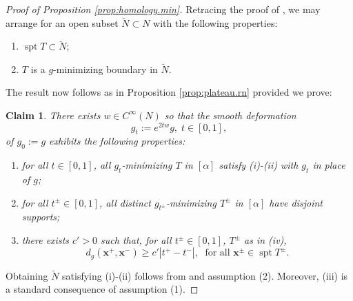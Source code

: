 \documentclass[11pt, letterpaper, reqno]{amsart}
\numberwithin{equation}{section}
\newtheorem{Cla}[Def]{Claim}
\theoremstyle{remark}
\newcommand{\mbfx}{\mathbf{x}}
\newcommand{\spt}{\operatorname{spt}}
\begin{document}
\begin{proof}[Proof of Proposition \ref{prop:homology.min}]
	Retracing the proof of \cite[Lemma 5.7]{CMS:generic.9.10}, we may arrange for an open subset $\breve N \subset N$ with the following properties:
	\begin{enumerate}
		\item[(i)] $\spt T \subset \breve N$;
		\item[(ii)] $T$ is a $g$-minimizing boundary in $\breve N$.
	\end{enumerate}
	The result now follows as in Proposition \ref{prop:plateau.rn} provided we prove:
	\begin{Cla} \label{clai:homology.min}
		There exists $w \in C^\infty(N)$ so that the smooth deformation
		\[ g_t := e^{2tw} g, \; t \in [0,1], \]
		of $g_0 := g$ exhibits the following properties:
		\begin{enumerate}
			\item[(iii)] for all $t \in [0,1]$, all $g_t$-minimizing $T$ in $[\alpha]$ satisfy (i)-(ii) with $g_t$ in place of $g$;
			\item[(iv)] for all $t^\pm \in [0,1]$, all distinct $g_{t^\pm}$-minimizing $T^\pm$ in $[\alpha]$ have disjoint supports;
			\item[(v)] there exists $c' > 0$ such that, for all $t^\pm \in [0,1]$, $T^\pm$ as in (iv),
			\[ d_g(\mbfx^+, \mbfx^-) \geq c' |t^+ - t^-|, \; \text{ for all } \mbfx^\pm \in \spt T^\pm. \]
		\end{enumerate}
	\end{Cla}
	
	Obtaining $\breve N$ satisfying (i)-(ii) follows from \cite[Lemma 5.7]{CMS:generic.9.10} and assumption (2). Moreover, (iii) is a standard consequence of assumption (1).
	

\end{proof}
\end{document}

